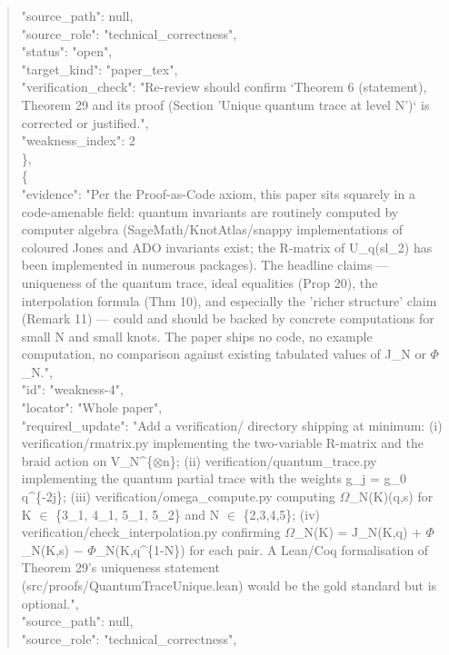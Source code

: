 \documentclass[11pt]{article}
\begin{document}
\begin{quote}
      "source\_path": null,\\
      "source\_role": "technical\_correctness",\\
      "status": "open",\\
      "target\_kind": "paper\_tex",\\
      "verification\_check": "Re-review should confirm `Theorem 6 (statement), Theorem 29 and its proof (Section 'Unique quantum trace at level N')` is corrected or justified.",\\
      "weakness\_index": 2\\
    \},\\
    \{\\
      "evidence": "Per the Proof-as-Code axiom, this paper sits squarely in a code-amenable field: quantum invariants are routinely computed by computer algebra (SageMath/KnotAtlas/snappy implementations of coloured Jones and ADO invariants exist; the R-matrix of U\_q(sl\_2) has been implemented in numerous packages). The headline claims --- uniqueness of the quantum trace, ideal equalities (Prop 20), the interpolation formula (Thm 10), and especially the 'richer structure' claim (Remark 11) --- could and should be backed by concrete computations for small N and small knots. The paper ships no code, no example computation, no comparison against existing tabulated values of J\_N or \ensuremath{\Phi}\_N.",\\
      "id": "weakness-4",\\
      "locator": "Whole paper",\\
      "required\_update": "Add a verification/ directory shipping at minimum: (i) verification/rmatrix.py implementing the two-variable R-matrix and the braid action on V\_N\^{}\{\ensuremath{\otimes}n\}; (ii) verification/quantum\_trace.py implementing the quantum partial trace with the weights g\_j = g\_0 q\^{}\{-2j\}; (iii) verification/omega\_compute.py computing \ensuremath{\Omega}\_N(K)(q,s) for K \ensuremath{\in} \{3\_1, 4\_1, 5\_1, 5\_2\} and N \ensuremath{\in} \{2,3,4,5\}; (iv) verification/check\_interpolation.py confirming \ensuremath{\Omega}\_N(K) = J\_N(K,q) + \ensuremath{\Phi}\_N(K,s) \ensuremath{-} \ensuremath{\Phi}\_N(K,q\^{}\{1-N\}) for each pair. A Lean/Coq formalisation of Theorem 29's uniqueness statement (src/proofs/QuantumTraceUnique.lean) would be the gold standard but is optional.",\\
      "source\_path": null,\\
      "source\_role": "technical\_correctness",\\

\end{quote}
\end{document}

